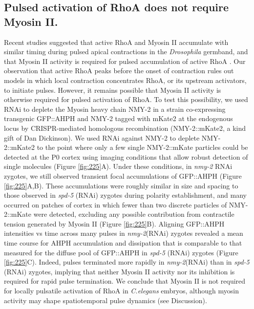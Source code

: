 \subsection{Pulsed activation of RhoA does not require Myosin II.}
Recent studies suggested that active RhoA and Myosin II accumulate with similar timing during pulsed apical contractions in the \textit{Drosophila} germband, and that Myosin II activity is required for pulsed accumulation of active RhoA \cite{Munjal:2015bx}. Our observation that active RhoA peaks before the onset of contraction rules out models in which local contraction concentrates RhoA, or its upstream activators, to initiate pulses. However, it remains possible that Myosin II activity is otherwise required for pulsed activation of RhoA. To test this possibility, we used RNAi to deplete the Myosin heavy chain NMY-2 in a strain co-expressing transgenic GFP::AHPH and NMY-2 tagged with mKate2 at the endogenous locus by CRISPR-mediated homologous recombination (NMY-2::mKate2, a kind gift of Dan Dickinson).  We used RNAi against NMY-2 to deplete NMY-2::mKate2 to the point where only a few single NMY-2::mKate particles could be detected at the P0 cortex using imaging conditions that allow robust detection of single molecules (Figure \ref{fig:225}A). Under these conditions, in \textit{nmy-2} RNAi zygotes, we still observed transient focal accumulations of GFP::AHPH (Figure \ref{fig:225}A,B).  These accumulations were roughly similar in size and spacing to those observed in \textit{spd-5} (RNAi) zygotes during polarity establishment, and many occurred on patches of cortex in which fewer than two discrete particles of NMY-2::mKate were detected, excluding any possible contribution from contractile tension generated by Myosin II (Figure \ref{fig:225}B). Aligning GFP::AHPH intensities vs time across many pulses in \textit{nmy-2}(RNAi) zygotes revealed a mean time course for AHPH accumulation and dissipation that is comparable to that measured for the diffuse pool of GFP::AHPH in \textit{spd-5} (RNAi) zygotes (Figure \ref{fig:225}C).  Indeed, pulses terminated more rapidly in \textit{nmy-2}(RNAi) than in \textit{spd-5} (RNAi) zygotes, implying that neither Myosin II activity nor its inhibition is required for rapid pulse termination. We conclude that Myosin II is not required for locally pulsatile activation of RhoA in \textit{C.elegans} embryos, although myosin activity may shape spatiotemporal pulse dynamics (see Discussion).

